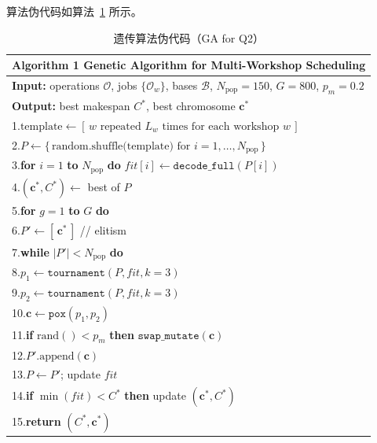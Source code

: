 \documentclass[12pt,a4paper]{ctexart}
\begin{document}
算法伪代码如算法~\ref{alg:ga} 所示。

\begin{table}[H]
\centering
\caption{遗传算法伪代码（GA for Q2）}\label{alg:ga}
\begin{tabular}{p{14cm}}
\toprule
\textbf{Algorithm 1} Genetic Algorithm for Multi-Workshop Scheduling \\
\midrule
\textbf{Input:} operations $\mathcal{O}$, jobs $\{ \mathcal{O}_w\}$, bases $\mathcal{B}$, $N_{\mathrm{pop}}=150$, $G=800$, $p_m=0.2$ \\
\textbf{Output:} best makespan $C^*$, best chromosome $\mathbf{c}^*$ \\
\midrule
1.\quad $\text{template} \leftarrow [\,w \text{ repeated } L_w \text{ times for each workshop } w\,]$ \\
2.\quad $P \leftarrow \{\,\text{random.shuffle(template) for } i=1,\dots,N_{\mathrm{pop}}\,\}$ \\
3.\quad \textbf{for } $i=1$ \textbf{to} $N_{\mathrm{pop}}$ \textbf{do} $\mathit{fit}[i] \leftarrow \texttt{decode\_full}(P[i])$ \\
4.\quad $(\mathbf{c}^*, C^*) \leftarrow$ best of $P$ \\
5.\quad \textbf{for } $g=1$ \textbf{to} $G$ \textbf{do} \\
6.\quad\quad $P' \leftarrow [\,\mathbf{c}^*\,]$ \hfill // elitism \\
7.\quad\quad \textbf{while } $|P'| < N_{\mathrm{pop}}$ \textbf{do} \\
8.\quad\quad\quad $p_1 \leftarrow \texttt{tournament}(P, \mathit{fit}, k=3)$ \\
9.\quad\quad\quad $p_2 \leftarrow \texttt{tournament}(P, \mathit{fit}, k=3)$ \\
10.\quad\quad\quad $\mathbf{c} \leftarrow \texttt{pox}(p_1, p_2)$ \\
11.\quad\quad\quad \textbf{if } $\mathrm{rand}() < p_m$ \textbf{then} $\texttt{swap\_mutate}(\mathbf{c})$ \\
12.\quad\quad\quad $P'.\mathrm{append}(\mathbf{c})$ \\
13.\quad\quad $P \leftarrow P'$;  update $\mathit{fit}$ \\
14.\quad\quad \textbf{if } $\min(\mathit{fit}) < C^*$ \textbf{then} update $(\mathbf{c}^*, C^*)$ \\
15.\quad \textbf{return } $(C^*, \mathbf{c}^*)$ \\
\bottomrule
\end{tabular}
\end{table}
\end{document}
